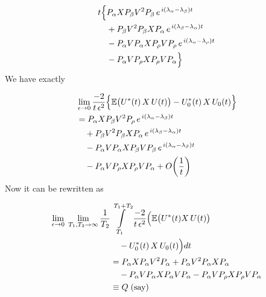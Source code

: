 \documentclass[journal,twocolumn]{IEEEtran}
\begin{document}
\begin{align}\nonumber
t\Bigl\{
&P_\alpha X P_\beta V^2 P_\beta\,e^{\,i(\lambda_\alpha-\lambda_\beta)t}
\\ \nonumber
&+ P_\beta V^2 P_\beta X P_\alpha\,e^{\,i(\lambda_\beta-\lambda_\alpha)t}
\\ \nonumber
&- P_\alpha V P_\alpha X P_\rho V P_\rho\,
   e^{\,i(\lambda_\alpha-\lambda_\rho)t}
\\
&- P_\alpha V P_\rho X P_\rho V P_\alpha\Bigr\}
\end{align}
We have exactly

\begin{align}\nonumber
&\lim_{\epsilon\rightarrow 0} \frac{-2}{t\,\epsilon^2}
\Bigl\{\Bbb{E}\bigl(U^*(t)\,X\,U(t)\bigr) - U_0^*(t)\,X\,U_0(t)\Bigr\}
\\ \nonumber
&= P_\alpha X P_\beta V^2 P_\rho\,
   e^{\,i(\lambda_\alpha-\lambda_\beta)t}
\\ \nonumber
&\quad + P_\beta V^2 P_\beta X P_\alpha\,
   e^{\,i(\lambda_\beta-\lambda_\alpha)t}
\\ \nonumber
&\quad - P_\alpha V P_\alpha X P_\beta V P_\beta\,
   e^{\,i(\lambda_\alpha-\lambda_\beta)t}
\\
&\quad - P_\alpha V P_\rho X P_\rho V P_\alpha
   + O\!\left(\frac{1}{t}\right)
\end{align}
Now it can be rewritten as

\begin{align}\nonumber
\lim_{\epsilon\rightarrow 0}\;\lim_{T_1,T_2\rightarrow\infty}
\frac{1}{T_2}&\int\limits_{T_1}^{T_1+T_2}
\frac{-2}{t\,\epsilon^2}
\Bigl(\Bbb{E}\bigl(U^*(t)X\,U(t)\bigr) \\&\quad- U_0^*(t)\,X\,U_0(t)\Bigr)dt
\\ \nonumber
&= P_\alpha X P_\alpha V^2 P_\alpha
 + P_\alpha V^2 P_\alpha X P_\alpha
\\ \nonumber
&\quad - P_\alpha V P_\alpha X P_\alpha V P_\alpha
       - P_\alpha V P_\rho X P_\rho V P_\alpha
\\
&\equiv Q \;(\text{say})
\end{align}
\end{document}
